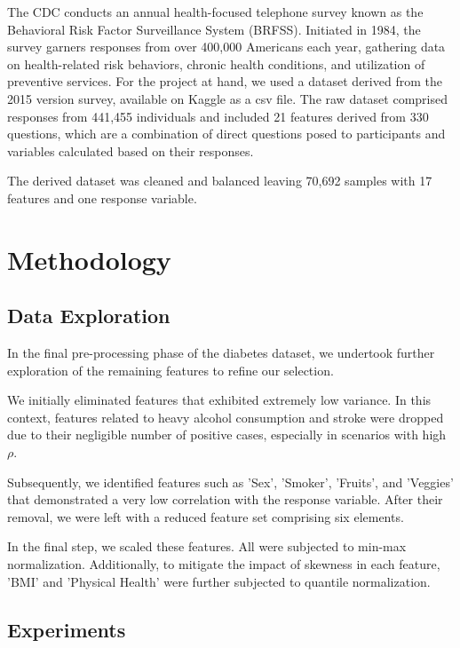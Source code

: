 \documentclass[journal]{IEEEtran}
\begin{document}
	The CDC conducts an annual health-focused telephone survey known as the Behavioral Risk Factor Surveillance System (BRFSS). Initiated in 1984, the survey garners responses from over 400,000 Americans each year, gathering data on health-related risk behaviors, chronic health conditions, and utilization of preventive services. For the project at hand, we used a dataset derived from the 2015 version survey, available on Kaggle as a csv file. The raw dataset comprised responses from 441,455 individuals and included 21 features derived from 330 questions, which are a combination of direct questions posed to participants and variables calculated based on their responses.

	The derived dataset was cleaned and balanced leaving 70,692 samples with 17 features and one response variable. 
	
	
	\section{Methodology}
	\label{sec:methodology}
	
	\subsection{Data Exploration}

	In the final pre-processing phase of the diabetes dataset, we undertook further exploration of the remaining features to refine our selection.
	
	We initially eliminated features that exhibited extremely low variance. In this context, features related to heavy alcohol consumption and stroke were dropped due to their negligible number of positive cases, especially in scenarios with high $\rho$.
	
	Subsequently, we identified features such as 'Sex', 'Smoker', 'Fruits', and 'Veggies' that demonstrated a very low correlation with the response variable. After their removal, we were left with a reduced feature set comprising six elements.
	
	In the final step, we scaled these features. All were subjected to min-max normalization. Additionally, to mitigate the impact of skewness in each feature, 'BMI' and 'Physical Health' were further subjected to quantile normalization.


\subsection{Experiments}
\end{document}

